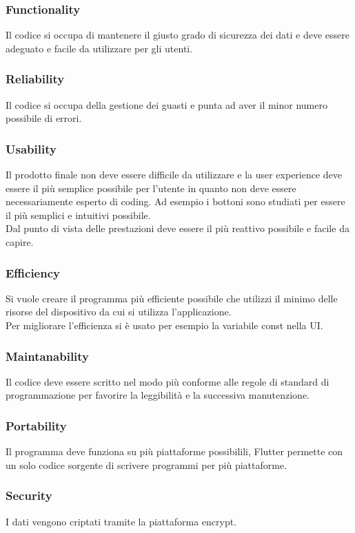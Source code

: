 \documentclass{article}
\begin{document}
\subsubsection{Functionality}
Il codice si occupa di mantenere il giusto grado di sicurezza dei dati e deve essere adeguato e facile
da utilizzare per gli utenti.

\subsubsection{Reliability}
Il codice si occupa della gestione dei guasti e punta ad aver il minor numero possibile di errori.

\subsubsection{Usability}
Il prodotto finale non deve essere difficile da utilizzare e la user experience deve essere il più
semplice possibile per l'utente in quanto non deve essere necessariamente esperto di coding.
Ad esempio i bottoni sono studiati per essere il più semplici e intuitivi possibile.
\\Dal punto di vista delle prestazioni deve essere il più reattivo possibile e facile da capire.

\subsubsection{Efficiency}
Si vuole creare il programma più efficiente possibile che utilizzi il minimo delle risorse del dispositivo
da cui si utilizza l'applicazione. 
\\Per migliorare l'efficienza si è usato per esempio la variabile const nella UI.

\subsubsection{Maintanability}
Il codice deve essere scritto nel modo più conforme alle regole di standard di programmazione per favorire
la leggibilità e la successiva manutenzione.

\subsubsection{Portability}
Il programma deve funziona su più piattaforme possibilili, Flutter permette con un solo codice 
sorgente di scrivere programmi per più piattaforme.

\subsubsection{Security}
I dati vengono criptati tramite la piattaforma encrypt.
\end{document}
